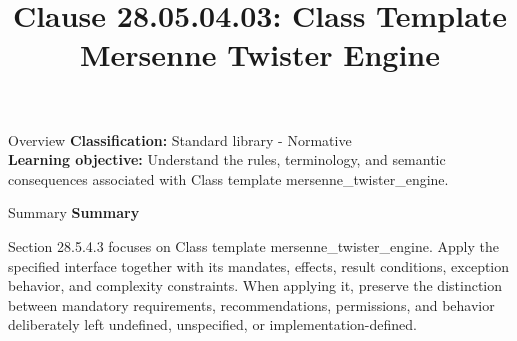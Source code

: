 \documentclass[10pt,letterpaper]{article}
\title{Clause 28.05.04.03: Class Template Mersenne Twister Engine}
\author{}
\date{}
\begin{document}
\maketitle
\begin{CornellOverviewBox}{Overview}
\textbf{Classification:} Standard library - Normative\\[2pt]
\textbf{Learning objective:} Understand the rules, terminology, and semantic consequences associated with Class template mersenne\_twister\_engine.
\end{CornellOverviewBox}\begin{CornellSummaryBox}{Summary}
{\sffamily\bfseries\color{Accent} Summary}\par\vspace{3pt}Section 28.5.4.3 focuses on Class template mersenne\_twister\_engine. Apply the specified interface together with its mandates, effects, result conditions, exception behavior, and complexity constraints. When applying it, preserve the distinction between mandatory requirements, recommendations, permissions, and behavior deliberately left undefined, unspecified, or implementation-defined.
\end{CornellSummaryBox}
\end{document}
